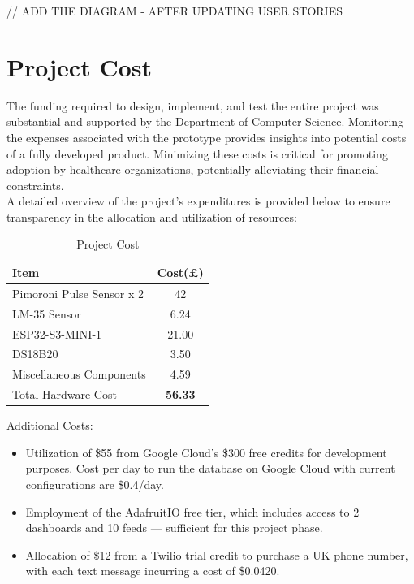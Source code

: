 // ADD THE DIAGRAM - AFTER UPDATING USER STORIES

\section{Project Cost}
The funding required to design, implement, and test the entire project was substantial and supported by the Department of Computer Science. Monitoring the expenses associated with the prototype provides insights into potential costs of a fully developed product. Minimizing these costs is critical for promoting adoption by healthcare organizations, potentially alleviating their financial constraints. \\

\noindent A detailed overview of the project's expenditures is provided below to ensure transparency in the allocation and utilization of resources:

\begin{table}[h!]
    \centering
    \begin{tabularx}{\textwidth}{|X|c|}
    \hline 
         \textbf{Item}& \textbf{Cost(£)}  \\ \hline
        Pimoroni Pulse Sensor x 2    &  42 \\ 
        LM-35 Sensor & 6.24 \\ 
        ESP32-S3-MINI-1 & 21.00 \\
        DS18B20 & 3.50 \\
        Miscellaneous Components & 4.59 \\ \hline
        Total Hardware Cost & \textbf{56.33} \\ \hline
        
    \end{tabularx}
    \caption{Project Cost}
    \label{tab:project-cost}
\end{table}

Additional Costs:

\begin{itemize}
    \item Utilization of \$55 from Google Cloud's \$300 free credits for development purposes. Cost per day to run the database on Google Cloud with current configurations are \$0.4/day.
    \item Employment of the AdafruitIO free tier, which includes access to 2 dashboards and 10 feeds — sufficient for this project phase.
    \item Allocation of \$12 from a Twilio trial credit to purchase a UK phone number, with each text message incurring a cost of \$0.0420.
\end{itemize}


